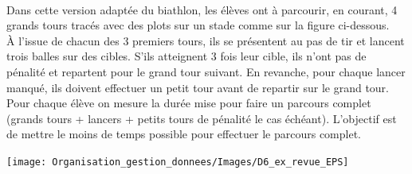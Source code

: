 \activites

\begin{activite}
   \ \\ [-16mm]
   \begin{QCM}
      Dans cette version adaptée du biathlon, les élèves ont à parcourir, en courant, 4 grands tours tracés avec des plots sur un stade comme sur la figure ci-dessous. \\
      À l'issue de chacun des 3 premiers tours, ils se présentent au pas de tir et lancent trois balles sur des cibles. S'ils atteignent 3 fois leur cible, ils n'ont pas de pénalité et repartent pour le grand tour suivant. En revanche, pour chaque lancer manqué, ils doivent effectuer un petit tour avant de repartir sur le grand tour. \\
Pour chaque élève on mesure la durée mise pour faire un parcours complet (grands tours + lancers + petits tours de pénalité le cas échéant). L'objectif est de mettre le moins de temps possible pour effectuer le parcours complet.

\begin{center}
   \texttt{[image: Organisation\_gestion\_donnees/Images/D6\_ex\_revue\_EPS]}
\end{center}


\end{QCM}
\end{activite}
